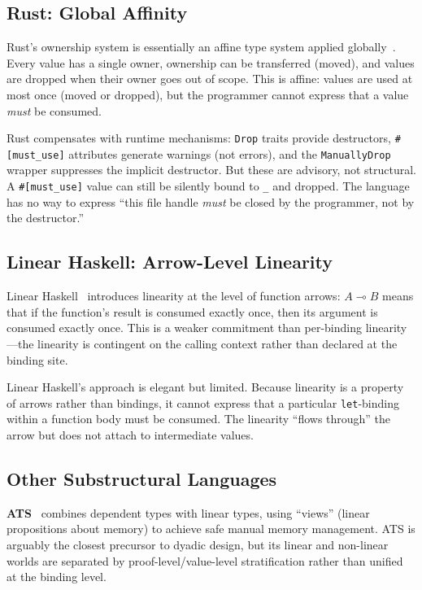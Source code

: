 \documentclass[11pt,a4paper]{article}
\begin{document}
\subsection{Rust: Global Affinity}

Rust's ownership system is essentially an affine type system applied
globally~\citep{jung2018rustbelt}. Every value has a single owner, ownership
can be transferred (moved), and values are dropped when their owner goes out of
scope. This is affine: values are used at most once (moved or dropped), but the
programmer cannot express that a value \emph{must} be consumed.

Rust compensates with runtime mechanisms: \lstinline{Drop} traits provide
destructors, \lstinline{#[must_use]} attributes generate warnings (not errors),
and the \lstinline{ManuallyDrop} wrapper suppresses the implicit destructor. But
these are advisory, not structural. A \lstinline{#[must_use]} value can still be
silently bound to \lstinline{_} and dropped. The language has no way to express
``this file handle \emph{must} be closed by the programmer, not by the
destructor.''

\subsection{Linear Haskell: Arrow-Level Linearity}

Linear Haskell~\citep{bernardy2018linear} introduces linearity at the level of
function arrows: $A \multimap B$ means that if the function's result is consumed
exactly once, then its argument is consumed exactly once. This is a weaker
commitment than per-binding linearity---the linearity is contingent on the
calling context rather than declared at the binding site.

Linear Haskell's approach is elegant but limited. Because linearity is a
property of arrows rather than bindings, it cannot express that a particular
\lstinline{let}-binding within a function body must be consumed. The linearity
``flows through'' the arrow but does not attach to intermediate values.

\subsection{Other Substructural Languages}

\textbf{ATS}~\citep{xi2017applied} combines dependent types with linear types,
using ``views'' (linear propositions about memory) to achieve safe manual memory
management. ATS is arguably the closest precursor to dyadic design, but its
linear and non-linear worlds are separated by proof-level/value-level
stratification rather than unified at the binding level.
\end{document}
